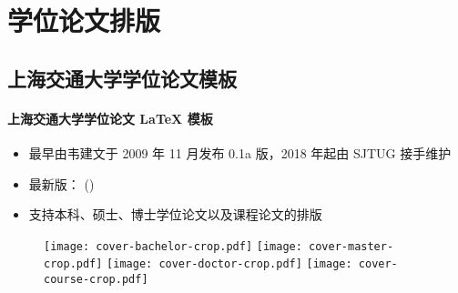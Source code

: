 
\section{学位论文排版}
\subsection{\SJTUThesis 上海交通大学学位论文模板}

\begin{frame}{\SJTUThesis}
  \framesubtitle{上海交通大学学位论文 \LaTeX{} 模板}
  \begin{itemize}
  \item 最早由韦建文于 2009 年 11 月发布 0.1a 版，2018 年起由 SJTUG 接手维护
  \item 最新版：\SJTUThesisVersion{} (\SJTUThesisDate)
  \item 支持本科、硕士、博士学位论文以及课程论文的排版
  \end{itemize}
  \begin{figure}[htbp]
    \centering
    \texttt{[image: cover-bachelor-crop.pdf]}\hspace{6pt}
    \texttt{[image: cover-master-crop.pdf]}\hspace{6pt}
    \texttt{[image: cover-doctor-crop.pdf]}\hspace{6pt}
    \texttt{[image: cover-course-crop.pdf]}
  \end{figure}
\end{frame}


